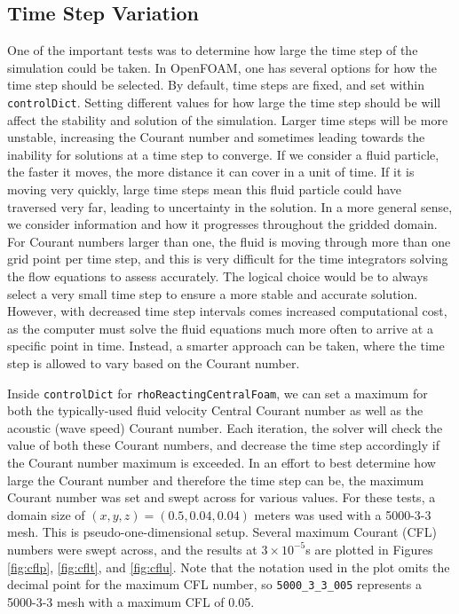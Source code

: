 \subsection{Time Step Variation}
One of the important tests was to determine how large the time step of the simulation could be taken. In OpenFOAM, one has several options for how the time step should be selected. By default, time steps are fixed, and set within \verb|controlDict|. Setting different values for how large the time step should be will affect the stability and solution of the simulation. Larger time steps will be more unstable, increasing the Courant number and sometimes leading towards the inability for solutions at a time step to converge. If we consider a fluid particle, the faster it moves, the more distance it can cover in a unit of time. If it is moving very quickly, large time steps mean this fluid particle could have traversed very far, leading to uncertainty in the solution. In a more general sense, we consider information and how it progresses throughout the gridded domain. For Courant numbers larger than one, the fluid is moving through more than one grid point per time step, and this is very difficult for the time integrators solving the flow equations to assess accurately. The logical choice would be to always select a very small time step to ensure a more stable and accurate solution. However, with decreased time step intervals comes increased computational cost, as the computer must solve the fluid equations much more often to arrive at a specific point in time. Instead, a smarter approach can be taken, where the time step is allowed to vary based on the Courant number. 

Inside \verb|controlDict| for \verb|rhoReactingCentralFoam|, we can set a maximum for both the typically-used fluid velocity Central Courant number as well as the acoustic (wave speed) Courant number. Each iteration, the solver will check the value of both these Courant numbers, and decrease the time step accordingly if the Courant number maximum is exceeded. In an effort to best determine how large the Courant number and therefore the time step can be, the maximum Courant number was set and swept across for various values. For these tests, a domain size of \( (x,y,z) = (0.5,0.04,0.04) \) meters was used with a 5000-3-3 mesh. This is pseudo-one-dimensional setup. Several maximum Courant (CFL) numbers were swept across, and the results at \(3\times 10^{ - 5}\)s are plotted in Figures \ref{fig:cflp}, \ref{fig:cflt}, and \ref{fig:cflu}. Note that the notation used in the plot omits the decimal point for the maximum CFL number, so \verb|5000_3_3_005| represents a 5000-3-3 mesh with a maximum CFL of 0.05. 

